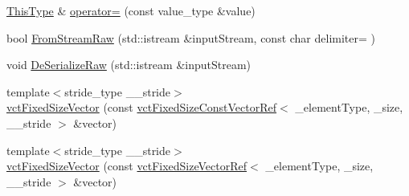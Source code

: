 \begin{DoxyCompactItemize}
\item 
\hyperlink{classvct_fixed_size_const_vector_base_a071063bc4fa43112cc287b2dbef53180}{This\+Type} \& \hyperlink{classvct_fixed_size_vector_a678b5e5c485fd4d489304731d47b73a1}{operator=} (const value\+\_\+type \&value)
\item 
bool \hyperlink{classvct_fixed_size_vector_a61750b6e61304640144fec19a9a65741}{From\+Stream\+Raw} (std\+::istream \&input\+Stream, const char delimiter= \textquotesingle{} \textquotesingle{})
\item 
void \hyperlink{classvct_fixed_size_vector_a87a245e3287fc139fc45f4a9935cb36f}{De\+Serialize\+Raw} (std\+::istream \&input\+Stream)
\end{DoxyCompactItemize}
{\bf }\par
\begin{DoxyCompactItemize}
\item 
{\footnotesize template$<$stride\+\_\+type \+\_\+\+\_\+stride$>$ }\\\hyperlink{classvct_fixed_size_vector_aab3dff36c45f37dcc0efc1b522ed704c}{vct\+Fixed\+Size\+Vector} (const \hyperlink{classvct_fixed_size_const_vector_ref}{vct\+Fixed\+Size\+Const\+Vector\+Ref}$<$ \+\_\+element\+Type, \+\_\+size, \+\_\+\+\_\+stride $>$ \&vector)
\item 
{\footnotesize template$<$stride\+\_\+type \+\_\+\+\_\+stride$>$ }\\\hyperlink{classvct_fixed_size_vector_a615b484a50c4d00c4f10f2dacd301a5c}{vct\+Fixed\+Size\+Vector} (const \hyperlink{classvct_fixed_size_vector_ref}{vct\+Fixed\+Size\+Vector\+Ref}$<$ \+\_\+element\+Type, \+\_\+size, \+\_\+\+\_\+stride $>$ \&vector)
\end{DoxyCompactItemize}


